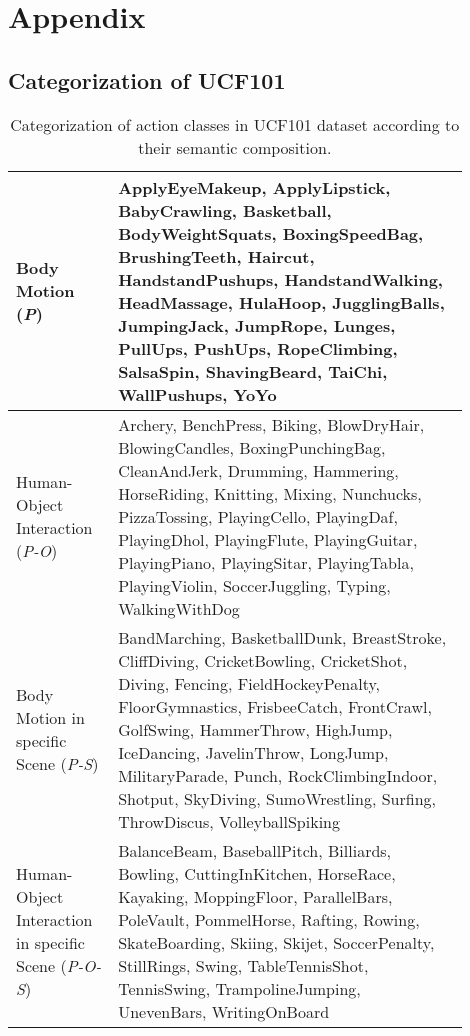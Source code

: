 
\chapter{Appendix}
\section{Categorization of UCF101}
\begin{table}[h]
\centering
\begin{tabular}{p{0.2\linewidth}|p{0.7\linewidth}}
\hline
Body Motion (\textit{P}) & ApplyEyeMakeup, ApplyLipstick, BabyCrawling, Basketball, BodyWeightSquats, BoxingSpeedBag, BrushingTeeth, Haircut, HandstandPushups, HandstandWalking, HeadMassage, HulaHoop, JugglingBalls, JumpingJack, JumpRope, Lunges, PullUps, PushUps, RopeClimbing, SalsaSpin, ShavingBeard, TaiChi, WallPushups, YoYo \\ \hline
Human-Object Interaction (\textit{P-O}) & Archery, BenchPress, Biking, BlowDryHair, BlowingCandles, BoxingPunchingBag, CleanAndJerk, Drumming, Hammering, HorseRiding, Knitting, Mixing, Nunchucks, PizzaTossing, PlayingCello, PlayingDaf, PlayingDhol, PlayingFlute, PlayingGuitar, PlayingPiano, PlayingSitar, PlayingTabla, PlayingViolin, SoccerJuggling, Typing, WalkingWithDog\\ \hline
Body Motion \newline in specific Scene (\textit{P-S})& BandMarching, BasketballDunk, BreastStroke, CliffDiving, CricketBowling, CricketShot, Diving, Fencing, FieldHockeyPenalty, FloorGymnastics, FrisbeeCatch, FrontCrawl, GolfSwing, HammerThrow, HighJump, IceDancing, JavelinThrow, LongJump, MilitaryParade, Punch, RockClimbingIndoor, Shotput, SkyDiving, SumoWrestling, Surfing, ThrowDiscus, VolleyballSpiking \\ \hline
Human-Object \newline Interaction \newline in specific Scene (\textit{P-O-S}) & BalanceBeam, BaseballPitch, Billiards, Bowling, CuttingInKitchen, HorseRace, Kayaking, MoppingFloor, ParallelBars, PoleVault, PommelHorse, Rafting, Rowing, SkateBoarding, Skiing, Skijet, SoccerPenalty, StillRings, Swing, TableTennisShot, TennisSwing, TrampolineJumping, UnevenBars, WritingOnBoard\\ \hline
\end{tabular}
\caption[Action categorization according to semantic cue]{Categorization of action classes in UCF101 dataset according to their semantic composition.}\label{tab:101categories}
\end{table}
\newpage
